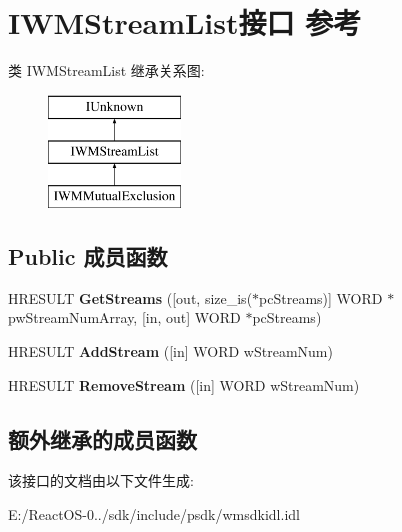 \hypertarget{interface_i_w_m_stream_list}{}\section{I\+W\+M\+Stream\+List接口 参考}
\label{interface_i_w_m_stream_list}
类 I\+W\+M\+Stream\+List 继承关系图\+:\begin{figure}[H]
\begin{center}
\leavevmode
\includegraphics[height=3.000000cm]{interface_i_w_m_stream_list}
\end{center}
\end{figure}
\subsection*{Public 成员函数}
\begin{DoxyCompactItemize}
\item 
\mbox{\label{interface_i_w_m_stream_list_a9ff584b8650aeaccca12b1ee8905d071}} 
H\+R\+E\+S\+U\+LT {\bfseries Get\+Streams} (\mbox{[}out, size\+\_\+is($\ast$pc\+Streams)\mbox{]} W\+O\+RD $\ast$pw\+Stream\+Num\+Array, \mbox{[}in, out\mbox{]} W\+O\+RD $\ast$pc\+Streams)
\item 
\mbox{\label{interface_i_w_m_stream_list_ac6362ac3188f37f258cf3a65ed6dfe3f}} 
H\+R\+E\+S\+U\+LT {\bfseries Add\+Stream} (\mbox{[}in\mbox{]} W\+O\+RD w\+Stream\+Num)
\item 
\mbox{\label{interface_i_w_m_stream_list_ae9304e9cfdb8235a8b9a0ee9e0a0b902}} 
H\+R\+E\+S\+U\+LT {\bfseries Remove\+Stream} (\mbox{[}in\mbox{]} W\+O\+RD w\+Stream\+Num)
\end{DoxyCompactItemize}
\subsection*{额外继承的成员函数}


该接口的文档由以下文件生成\+:\begin{DoxyCompactItemize}
\item 
E\+:/\+React\+O\+S-\/0../sdk/include/psdk/wmsdkidl.\+idl\end{DoxyCompactItemize}
